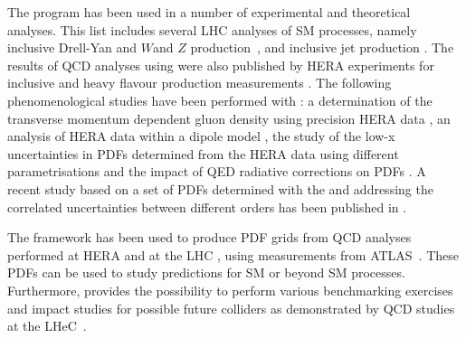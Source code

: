 The \fitter program has been used in a number of experimental and theoretical analyses. 
This list includes several LHC analyses of SM processes, namely
inclusive Drell-Yan and $W$and $Z$ production~\cite{atlas:strange,cms:strange,atlas:hm,Aad:2014qja,Aad:2014xca}, and
inclusive jet production \cite{atlas:jets}.
The results of QCD analyses using \fitter were also
published by HERA experiments for inclusive \cite{h1zeus:2009wt,h1:2012kk} and
 heavy flavour production measurements \cite{h1zeus:charm, Abramowicz:2014zub}.
The following phenomenological studies have been performed with \fitter:
a determination of the transverse momentum dependent gluon density using precision HERA data \cite{Hautmann:2013tba}, 
an analysis of HERA data within a dipole model \cite{Luszczak:2013rxa},
the study of the low-x uncertainties in PDFs determined from the HERA data using 
different parametrisations \cite{Chebyshev} and the impact of QED radiative corrections on PDFs \cite{Sadykov:2014aua}.
A recent study based on a set of PDFs determined with the \fitter and addressing 
the correlated uncertainties between different orders has been published in \cite{hfcorrpaper}. 

The \fitter framework has been used to produce PDF grids from QCD analyses performed at 
HERA \cite{h1zeus:2009wt,hera:grids} and at the LHC \cite{atlas:grids}, using 
measurements from ATLAS~\cite{atlas:strange,atlas:jets}. These PDFs can be used to study predictions for SM 
or beyond SM processes. Furthermore, \fitter provides the possibility to perform various benchmarking exercises
\cite{Butterworth:2014efa} and impact studies for possible future colliders
as demonstrated by QCD studies at the LHeC~\cite{lhec:studies}.









